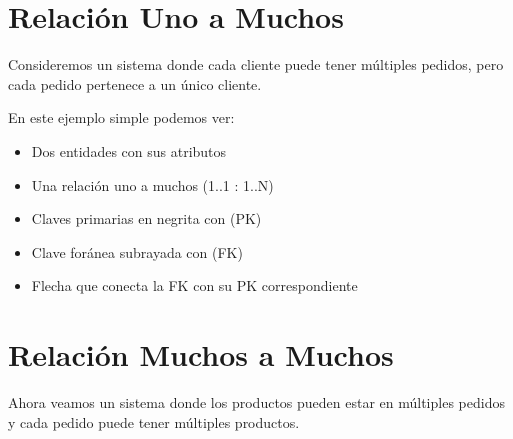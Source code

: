 \documentclass[12pt]{article}
\begin{document}
\section{Relación Uno a Muchos}
Consideremos un sistema donde cada cliente puede tener múltiples pedidos, pero cada pedido pertenece a un único cliente.

\begin{center}
\end{center}

En este ejemplo simple podemos ver:
\begin{itemize}
    \item Dos entidades con sus atributos
    \item Una relación uno a muchos (1..1 : 1..N)
    \item Claves primarias en negrita con (PK)
    \item Clave foránea subrayada con (FK)
    \item Flecha que conecta la FK con su PK correspondiente
\end{itemize}

\section{Relación Muchos a Muchos}
Ahora veamos un sistema donde los productos pueden estar en múltiples pedidos y cada pedido puede tener múltiples productos.
\end{document}
